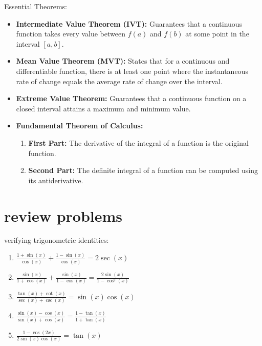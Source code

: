 \documentclass{article}
\begin{document}
Essential Theorems:
\begin{itemize}
    \item \textbf{Intermediate Value Theorem (IVT):} Guarantees that a continuous function takes every value between \( f(a) \) and \( f(b) \) at some point in the interval \([a, b]\).
    \item \textbf{Mean Value Theorem (MVT):} States that for a continuous and differentiable function, there is at least one point where the instantaneous rate of change equals the average rate of change over the interval.
    \item \textbf{Extreme Value Theorem:} Guarantees that a continuous function on a closed interval attains a maximum and minimum value.
    \item \textbf{Fundamental Theorem of Calculus:}
    \begin{enumerate}
        \item \textbf{First Part:} The derivative of the integral of a function is the original function.
        \item \textbf{Second Part:} The definite integral of a function can be computed using its antiderivative.
    \end{enumerate}
\end{itemize}

\newpage
\section*{review problems}

verifying trigonometric identities:
	\begin{enumerate}
		\item $\frac{1 + \sin(x)}{\cos(x)} + \frac{1 - \sin(x)}{\cos(x)} = 2\sec(x)$
		\item $\frac{\sin(x)}{1 + \cos(x)} + \frac{\sin(x)}{1 - \cos(x)} = \frac{2\sin(x)}{1 - \cos^2(x)}$
		\item $\frac{\tan(x) + \cot(x)}{\sec(x) + \csc(x)} = \sin(x)\cos(x)$
		\item $\frac{\sin(x) - \cos(x)}{\sin(x) + \cos(x)} = \frac{1 - \tan(x)}{1 + \tan(x)}$
		\item $\frac{1 - \cos(2x)}{2\sin(x)\cos(x)} = \tan(x)$
	\end{enumerate}
\end{document}
